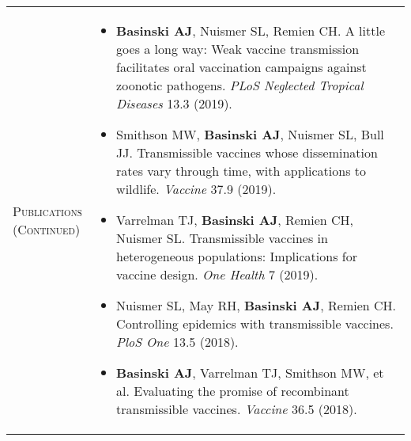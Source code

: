 \documentclass[11pt]{article}
\newcommand{\cellone}{3.5cm} %
\newcommand{\celltwo}{11cm}
\newcommand{\spa}{\vspace{.4in}}
\begin{document}
\newpage

\begin{tabularx}{\textwidth}{p{\cellone} p{\celltwo}}
  \parbox[t][0cm]{\cellone}{P\textsc{ublications}
    \\ \textsc{(Continued)}} & \parbox[t][0cm]{12cm}{

    \vspace{-0.65cm}
    \begin{itemize}


      
    \item {\bf Basinski AJ}, Nuismer SL, Remien CH. A little goes a
      long way: Weak vaccine transmission facilitates oral vaccination
      campaigns against zoonotic pathogens. \emph{PLoS Neglected
      Tropical Diseases} 13.3 (2019).

      \vspace{0.05in}

      \item Smithson MW, {\bf Basinski AJ}, Nuismer SL, Bull
        JJ. Transmissible vaccines whose dissemination rates vary
        through time, with applications to wildlife. \emph{Vaccine}
        37.9 (2019).

      \vspace{0.05in}
        

    \item Varrelman TJ, {\bf Basinski AJ}, Remien CH, Nuismer
      SL. Transmissible vaccines in heterogeneous populations:
      Implications for vaccine design. \emph{One Health} 7 (2019).

      \vspace{0.05in}
      
    \item Nuismer SL, May RH, {\bf Basinski AJ}, Remien
      CH. Controlling epidemics with transmissible
      vaccines. \emph{PloS One} 13.5 (2018).
      
      \vspace{0.05in}
      
    \item {\bf Basinski AJ}, Varrelman TJ, Smithson MW, et
      al. Evaluating the promise of recombinant transmissible
      vaccines. \emph{Vaccine} 36.5 (2018).
      
    \end{itemize}
  }
\end{tabularx}

\spa
\spa
\spa
\spa
\spa
\spa
\spa
\spa
\spa
\end{document}
